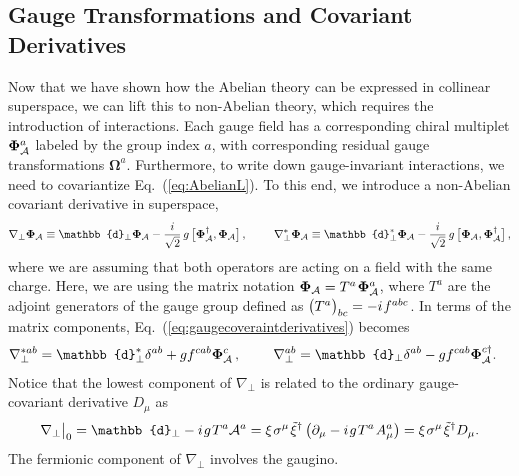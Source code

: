 \documentclass[12pt,document,nofootinbib,superscriptaddress,onecolumn,preprintnumbers,balancelastpage]{article}
\newcommand{\s}{\hspace{0.8pt}}
\newcommand{\PP}{\mathbb{d}}
\DeclareRobustCommand{\Eq}[1]{Eq.~(\ref{#1})}
\newcommand{\RCA}{\boldsymbol{\Omega}}
\newcommand{\alc}{\mathcal{A}}
\newcommand{\bPhiA}{\bold \Phi_{\alc}}
\newcommand{\bPhialc}{ \bold \Phi_\alc}
\begin{document}
\begin{spacing}{1.2}
\subsection{Gauge Transformations and Covariant Derivatives}
Now that we have shown how the Abelian theory can be expressed in collinear superspace, we can lift this to non-Abelian theory, which requires the introduction of interactions.
%
Each gauge field has a corresponding chiral multiplet $\bPhiA^{a}$ labeled by the group index $a$, with corresponding residual gauge transformations $\RCA^a$.
%
Furthermore, to write down gauge-invariant interactions, we need to covariantize \Eq{eq:AbelianL}.
%
To this end, we introduce a non-Abelian covariant derivative in superspace,
%
\begin{align}
\label{eq:gaugecoveraintderivatives}
\nabla_\perp \bPhialc \equiv \PP_\perp \bPhialc - \frac{i}{\sqrt{2}}  \, g \, \big[\bPhiA^\dagger, \bPhialc\big]  \, , \,\, \quad \quad \nabla_\perp^* \bPhialc \equiv  \PP_\perp^* \bPhialc - \frac{i}{\sqrt{2}}  \, g \, \big[\bPhiA , \bPhialc^\dagger \big] \,,
\end{align}
%
%
where we are assuming that both operators are acting on a field with the same charge.
%
Here, we are using the matrix notation $\bPhiA = T^a \s \bPhiA^a$,  where $T^a$ are the adjoint generators of the gauge group defined as $\big(T^a\big)_{bc} = -  i\s f^{abc}$.
%
In terms of the matrix components, \Eq{eq:gaugecoveraintderivatives} becomes
 \begin{align}
 \label{eq:nablaComp}
&\nabla^{* ab }_\perp = \PP_\perp^* \delta^{ab} + g f^{cab} \bPhiA^{c}  \, , \,\, \quad \quad \nabla^{ab}_\perp = \PP_\perp \delta^{ab} - g f^{cab} \bPhiA^{c  \dagger}.
\end{align} 
%
Notice that the lowest component of $\nabla_\perp$ is related to the ordinary gauge-covariant derivative $D_\mu$ as 
%
\begin{equation}
\nabla_\perp \big|_0 = \PP_\perp - i\s g\s T^a \alc^a = \xi\s \sigma^\mu\s \tilde{\xi}^\dagger \left(\partial_\mu - i\s g\s T^a\s A^a_\mu\right) = \xi\s \sigma^\mu\s \tilde{\xi}^\dagger D_\mu.
\end{equation}
% 
The fermionic component of $\nabla_\perp$ involves the gaugino. 


\end{spacing}
\end{document}
